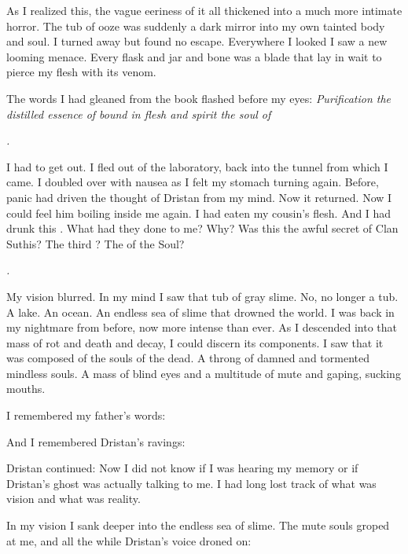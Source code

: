 \documentclass
  [a4paper,
   12pt,
   oneside
  ]%
  {article}
\begin{document}

As I realized this, the vague eeriness of it all thickened into a much more intimate horror. 
The tub of ooze was suddenly a dark mirror into my own tainted body and soul.
I turned away but found no escape. 
Everywhere I looked I saw a new looming menace. 
Every flask and jar and bone was a blade that lay in wait to pierce my flesh with its venom. 

The words I had gleaned from the book flashed before my eyes:
\emph{%
  Purification\prikker 
  the distilled essence of \Ubloth\prikker 
  bound in flesh and spirit\prikker 
  the soul of \Ubloth\prikker}

\emph{\Ubloth.}

I had to get out. 
I fled out of the laboratory, back into the tunnel from which I came. 
I doubled over with nausea as I felt my stomach turning again.
Before, panic had driven the thought of Dristan from my mind. 
Now it returned. 
Now I could feel him boiling inside me again. 
I had eaten my cousin's flesh.
And I had drunk this .
What had they done to me?
Why? 
Was this the awful secret of Clan Suthis?
The third \Arcanum?
The \Arcanum of the Soul?

\emph{\Ubloth.}

My vision blurred. 
In my mind I saw that tub of gray slime. 
No, no longer a tub. 
A lake. 
An ocean. 
An endless sea of slime that drowned the world. 
I was back in my nightmare from before, now more intense than ever. 
As I descended into that mass of rot and death and decay, I could discern its components.
I saw that it was composed of the souls of the dead. 
A throng of damned and tormented mindless souls. 
A mass of blind eyes and a multitude of mute and gaping, sucking mouths.

I remembered my father's words: 

And I remembered Dristan's ravings: 

Dristan continued: 
Now I did not know if I was hearing my memory or if Dristan's ghost was actually talking to me.
I had long lost track of what was vision and what was reality.

In my vision I sank deeper into the endless sea of slime. 
The mute souls groped at me, and all the while Dristan's voice droned on: 
\end{document}
